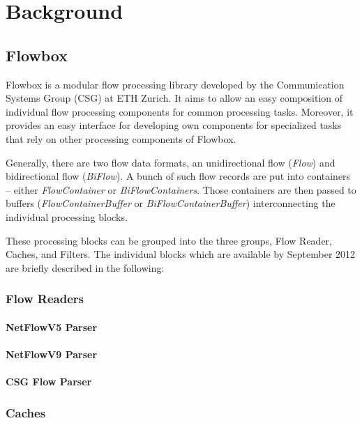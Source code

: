 \chapter{Background\label{Background}}

\section{Flowbox
\label{section:flowbox}}

Flowbox is a modular flow processing library developed by the Communication Systems Group (CSG) at ETH Zurich. It aims to allow an easy composition of individual flow processing components for common processing tasks. Moreover, it provides an easy interface for developing own components for specialized tasks that rely on other processing components of Flowbox.

Generally, there are two flow data formats, an unidirectional flow (\emph{Flow}) and bidirectional flow (\emph{BiFlow}). A bunch of such flow records are put into containers -- either \emph{FlowContainer} or \emph{BiFlowContainers}. Those containers are then passed to buffers (\emph{FlowContainerBuffer} or \emph{BiFlowContainerBuffer}) interconnecting the individual processing blocks.

These processing blocks can be grouped into the three groups, Flow Reader, Caches, and Filters. The individual blocks which are available by September 2012 are briefly described in the following:

\subsection{Flow Readers}

\subsubsection{NetFlowV5 Parser} 
\subsubsection{NetFlowV9 Parser}
\subsubsection{CSG Flow Parser} 


\subsection{Caches}
